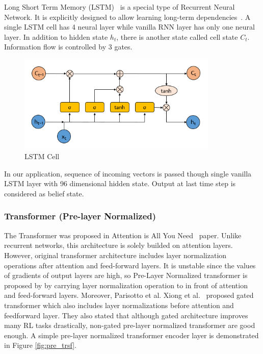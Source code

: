 \documentclass[a4paper, 12pt]{article} %
\begin{document}
Long Short Term Memory (LSTM)~\cite{hochreiter_long_1997} is a special type of Recurrent Neural Network. 
It is explicitly designed to allow learning long-term dependencies~\cite{olah_understanding_2015}. 
A single LSTM cell has 4 neural layer while vanilla RNN layer has only one neural layer. 
In addition to hidden state $h_t$, there is another state called cell state $C_t$. 
Information flow is controlled by 3 gates. 

\begin{figure}
	\centering
	\includegraphics[width=0.85\textwidth]{figures/ml_theory/lstm_cell.png}
	\caption{LSTM Cell~\cite{olah_understanding_2015}}
	\label{fig:lstm_cell}
\end{figure}

In our application, sequence of incoming vectors is passed though single vanilla LSTM layer with 96 dimensional hidden state. 
Output at last time step is considered as belief state. 

\subsubsection{Transformer (Pre-layer Normalized)}

The Transformer was proposed in Attention is All You Need~ \cite{vaswani_attention_2017} paper. 
Unlike recurrent networks, this architecture is solely builded on attention layers. 
However, original transformer architecture includes layer normalization operations after attention and feed-forward layers. 
It is unstable since the values of gradients of output layers are high, so Pre-Layer Normalized transformer is proposed by \cite{xiong_layer_2020} by carrying layer normalization operation to in front of attention and feed-forward layers. 
Moreover, Parisotto et al. Xiong et al.~ \cite{parisotto_stabilizing_2019} proposed gated transformer which also includes layer normalizations before attention and feedforward layer. 
They also stated that although gated architecture improves many RL tasks drastically, non-gated pre-layer normalized transformer are good enough. 
A simple pre-layer normalized transformer encoder layer is demonstrated in Figure \ref{fig:pre_trsf}.
\end{document}
